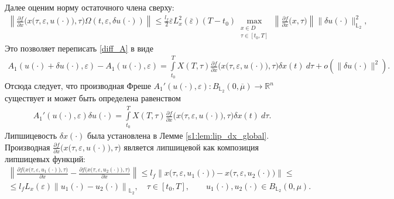 \documentclass[../main.tex]{subfiles}
\begin{document}
Далее оценим норму остаточного члена сверху:
\begin{gather*}
 \left\| 
 \frac{\partial f}{\partial x} \Big(x\big(\tau,\varepsilon, u(\cdot)\big), \tau\Big) \Omega(t,\varepsilon, \delta u(\cdot)) 
 \right\| 
 \leqslant
 \frac{l_f}{2}
 \overline{\varepsilon} 
 L_x^2(\overline{\varepsilon})
 (T-t_0)
 \max_{\substack{x\in D \\ \tau \in [t_0,T]}} 
 \left\|\frac{\partial f}{\partial x} \Big(x, \tau\Big) \right\|
 \|\delta u(\cdot)\|_{\mathbb{L}_2}^2,
\end{gather*}
Это позволяет переписать \eqref{diff_A} в виде
\begin{gather}
 A_1(u(\cdot) + \delta u(\cdot),\varepsilon) - A_1(u(\cdot),\varepsilon) = \int\limits_{t_0}^T X(T,\tau) \frac{\partial f}{\partial x} \Big(x\big(\tau,\varepsilon, u(\cdot)\big), \tau\Big) \delta x(t) \ d\tau + o(\|\delta u(\cdot)\|^2).
\end{gather}
Отсюда следует, что производная Фреше $A_1'(u(\cdot),\varepsilon): B_{\mathbb{L}_2}(0,\overline{\mu}) \to \mathbb{R}^n $ существует и может быть определена равенством
\begin{gather}\label{A1_diff}
 A_1'(u(\cdot),\varepsilon)\delta u(\cdot) = \int\limits_{t_0}^T X(T,\tau) \frac{\partial f}{\partial x} \Big(x\big(\tau,\varepsilon, u(\cdot)\big), \tau\Big) \delta x(t) \ d\tau.
\end{gather}
Липшицевость $\delta x(\cdot)$ была установлена в Лемме \ref{s1:lem:lip_dx_global}. 
Производная $\frac{\partial f}{\partial x} \Big(x\big(\tau,\varepsilon, u(\cdot)\big),\tau\Big)$ является липшицевой как композиция липшицевых функций:
\begin{gather*}
 \left\| \frac{\partial f \Big(x\big(\tau,\varepsilon, u_1(\cdot)\big),\tau\Big)} {\partial x} - \frac{\partial f \Big(x\big(\tau,\varepsilon, u_2(\cdot)\big),\tau\Big)} {\partial x} \right\| \leqslant l_f \left\|x\big(\tau,\varepsilon, u_1(\cdot) \big) - x\big(\tau,\varepsilon, u_2(\cdot)\big) \right\| \leqslant \\ \leqslant l_f L_x(\varepsilon) \left\| u_1(\cdot) - u_2(\cdot) \right\|_{\mathbb{L}_2}, \quad \tau \in [t_0, T], \qquad u_1(\cdot), u_2(\cdot) \in B_{\mathbb{L}_2}(0,\mu).
\end{gather*}
\end{document}
